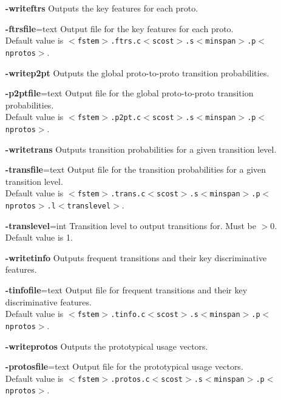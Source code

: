 \documentclass[]{article}
\begin{document}
\begin{description}[align=left,style=nextline,leftmargin=*,font=\normalfont]
\begin{itemize}[leftmargin=+.8in]
    \item[\bf-writeftrs]
       Outputs the key features for each proto. 

    \item[\textbf{-ftrsfile}=text]
       Output file for the key features for each proto.\\
       Default value is
       {\tt$<$fstem$>$.ftrs.c$<$scost$>$.s$<$minspan$>$.p$<$nprotos$>$}.

    \item[\bf-writep2pt]
       Outputs the global proto-to-proto transition probabilities.

    \item[\textbf{-p2ptfile}=text]
       Output file for the global proto-to-proto transition probabilities.\\
       Default value is
       {\tt$<$fstem$>$.p2pt.c$<$scost$>$.s$<$minspan$>$.p$<$nprotos$>$}.

    \item[\bf-writetrans]
       Outputs transition probabilities for a given transition level.

    \item[\textbf{-transfile}=text]
       Output file for the transition probabilities for a given transition level.\\
       Default value is
       {\tt$<$fstem$>$.trans.c$<$scost$>$.s$<$minspan$>$.p$<$nprotos$>$.l$<$translevel$>$}.

    \item[\textbf{-translevel}=int]
       Transition level to output transitions for. Must be $> 0$.\\
       Default value is 1.

    \item[\bf-writetinfo]
       Outputs frequent transitions and their key discriminative features.

    \item[\textbf{-tinfofile}=text]
       Output file for frequent transitions and their key discriminative features.\\
       Default value is
       {\tt$<$fstem$>$.tinfo.c$<$scost$>$.s$<$minspan$>$.p$<$nprotos$>$}.

    \item[\bf-writeprotos]
       Outputs the prototypical usage vectors.

    \item[\textbf{-protosfile}=text]
       Output file for the prototypical usage vectors.\\
       Default value is
       {\tt$<$fstem$>$.protos.c$<$scost$>$.s$<$minspan$>$.p$<$nprotos$>$}.


\end{itemize}
\end{description}
\end{document}
